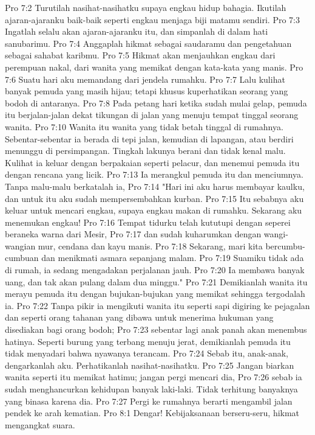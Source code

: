 Pro 7:2  Turutilah nasihat-nasihatku supaya engkau hidup bahagia. Ikutilah ajaran-ajaranku baik-baik seperti engkau menjaga biji matamu sendiri.
Pro 7:3  Ingatlah selalu akan ajaran-ajaranku itu, dan simpanlah di dalam hati sanubarimu.
Pro 7:4  Anggaplah hikmat sebagai saudaramu dan pengetahuan sebagai sahabat karibmu.
Pro 7:5  Hikmat akan menjauhkan engkau dari perempuan nakal, dari wanita yang memikat dengan kata-kata yang manis.
Pro 7:6  Suatu hari aku memandang dari jendela rumahku.
Pro 7:7  Lalu kulihat banyak pemuda yang masih hijau; tetapi khusus kuperhatikan seorang yang bodoh di antaranya.
Pro 7:8  Pada petang hari ketika sudah mulai gelap, pemuda itu berjalan-jalan dekat tikungan di jalan yang menuju tempat tinggal seorang wanita.
Pro 7:10  Wanita itu wanita yang tidak betah tinggal di rumahnya. Sebentar-sebentar ia berada di tepi jalan, kemudian di lapangan, atau berdiri menunggu di persimpangan. Tingkah lakunya berani dan tidak kenal malu. Kulihat ia keluar dengan berpakaian seperti pelacur, dan menemui pemuda itu dengan rencana yang licik.
Pro 7:13  Ia merangkul pemuda itu dan menciumnya. Tanpa malu-malu berkatalah ia,
Pro 7:14  "Hari ini aku harus membayar kaulku, dan untuk itu aku sudah mempersembahkan kurban.
Pro 7:15  Itu sebabnya aku keluar untuk mencari engkau, supaya engkau makan di rumahku. Sekarang aku menemukan engkau!
Pro 7:16  Tempat tidurku telah kututupi dengan seperei beraneka warna dari Mesir,
Pro 7:17  dan sudah kuharumkan dengan wangi-wangian mur, cendana dan kayu manis.
Pro 7:18  Sekarang, mari kita bercumbu-cumbuan dan menikmati asmara sepanjang malam.
Pro 7:19  Suamiku tidak ada di rumah, ia sedang mengadakan perjalanan jauh.
Pro 7:20  Ia membawa banyak uang, dan tak akan pulang dalam dua minggu."
Pro 7:21  Demikianlah wanita itu merayu pemuda itu dengan bujukan-bujukan yang memikat sehingga tergodalah ia.
Pro 7:22  Tanpa pikir ia mengikuti wanita itu seperti sapi digiring ke pejagalan dan seperti orang tahanan yang dibawa untuk menerima hukuman yang disediakan bagi orang bodoh;
Pro 7:23  sebentar lagi anak panah akan menembus hatinya. Seperti burung yang terbang menuju jerat, demikianlah pemuda itu tidak menyadari bahwa nyawanya terancam.
Pro 7:24  Sebab itu, anak-anak, dengarkanlah aku. Perhatikanlah nasihat-nasihatku.
Pro 7:25  Jangan biarkan wanita seperti itu memikat hatimu; jangan pergi mencari dia,
Pro 7:26  sebab ia sudah menghancurkan kehidupan banyak laki-laki. Tidak terhitung banyaknya yang binasa karena dia.
Pro 7:27  Pergi ke rumahnya berarti mengambil jalan pendek ke arah kematian.
Pro 8:1  Dengar! Kebijaksanaan berseru-seru, hikmat mengangkat suara.
